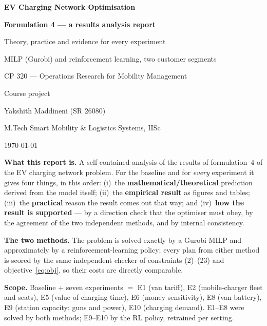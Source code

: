 \documentclass[11pt,a4paper]{article}
\renewcommand{\_}{\origunderscore\allowbreak}
\theoremstyle{definition}
\begin{document}
\begin{titlepage}
\centering
\vspace*{1.6cm}
{\LARGE\bfseries\color{headblue} EV Charging Network Optimisation\par}
\vspace{8pt}
{\Large\bfseries Formulation 4 --- a results analysis report\par}
\vspace{6pt}
{\large Theory, practice and evidence for every experiment\par}
\vspace{10pt}
{\large MILP (Gurobi) and reinforcement learning, two customer segments\par}
\vspace{22pt}
{\large CP 320 --- Operations Research for Mobility Management\par}
{\normalsize Course project\par}
\vspace{20pt}
{\large Yakshith Maddineni \quad (SR 26080)\par}
{\normalsize M.Tech Smart Mobility \& Logistics Systems, IISc\par}
\vspace{6pt}
{\normalsize \today\par}
\vfill
\begin{keybox}
\textbf{What this report is.} A self-contained analysis of the results of formulation~4 of the EV charging
network problem. For the baseline and for \emph{every} experiment it gives four things, in this order:
(i)~the \textbf{mathematical/theoretical} prediction derived from the model itself; (ii)~the \textbf{empirical
result} as figures and tables; (iii)~the \textbf{practical} reason the result comes out that way; and
(iv)~\textbf{how the result is supported} --- by a direction check that the optimiser must obey, by the
agreement of the two independent methods, and by internal consistency.

\textbf{The two methods.} The problem is solved exactly by a Gurobi MILP and approximately by a reinforcement-learning
policy; every plan from either method is scored by the same independent checker of constraints (2)--(23) and
objective~\eqref{eq:obj}, so their costs are directly comparable.

\textbf{Scope.} Baseline $+$ seven experiments $=$ E1 (van tariff), E2 (mobile-charger fleet and seats),
E5 (value of charging time), E6 (money sensitivity), E8 (van battery), E9 (station capacity: guns and power),
E10 (charging demand). E1--E8 were solved by both methods; E9--E10 by the RL policy, retrained per setting.
\end{keybox}
\end{titlepage}
\end{document}
